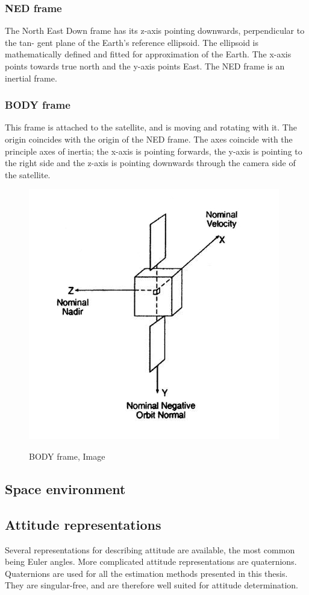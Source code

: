 \documentclass[12pt,a4paper,oneside]{article}
\begin{document}
\subsubsection{NED frame}
The North East Down frame has its z-axis pointing downwards, perpendicular to the tan-
gent plane of the Earth’s reference ellipsoid. The ellipsoid is mathematically defined and
fitted for approximation of the Earth. The x-axis points towards true north and the y-axis
points East. The NED frame is an inertial frame.
\subsubsection{BODY frame}
This frame is attached to the satellite, and is moving and rotating with it. The origin
coincides with the origin of the NED frame. The axes coincide with the principle axes
of inertia; the x-axis is pointing forwards, the y-axis is pointing to the right side and the
z-axis is pointing downwards through the camera side of the satellite.
\begin{figure}[h]
\includegraphics[scale=0.5]{body_frame.jpg}
\centering
\label{fig:body_frame}
\caption{BODY frame, Image \cite{larson1992space}}
\end{figure}
\subsection{Space environment}
\subsection{Attitude representations}
Several representations for describing attitude are available, the most common being Euler
angles. More complicated attitude representations are quaternions. Quaternions are used
for all the estimation methods presented in this thesis. They are singular-free, and are
therefore well suited for attitude determination.
\end{document}
